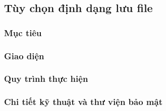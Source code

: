 \newpage
\subsection{Tùy chọn định dạng lưu file}
\subsubsection*{Mục tiêu}

\subsubsection*{Giao diện}

\subsubsection*{Quy trình thực hiện}

\subsubsection*{Chi tiết kỹ thuật và thư viện bảo mật}
